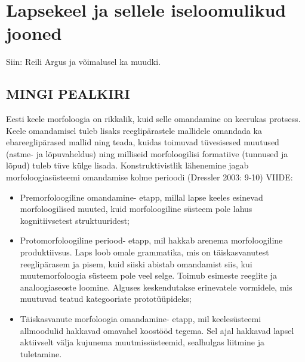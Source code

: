\documentclass[12pt]{article}
\begin{document}
\newpage
\section{Lapsekeel ja sellele iseloomulikud jooned}
Siin: Reili Argus ja võimalusel ka muudki.


\subsection{MINGI PEALKIRI}

Eesti keele morfoloogia on rikkalik, kuid selle omandamine on keerukas protsess. Keele omandamisel tuleb lisaks reeglipärastele mallidele omandada ka ebareeglipärased mallid ning teada, kuidas toimuvad tüvesisesed muutused (astme- ja lõpuvaheldus) ning milliseid morfoloogilisi formatiive (tunnused ja lõpud) tuleb tüve külge lisada. 
Konstruktivistlik lähenemine jagab morfoloogiasüsteemi omandamise kolme perioodi (Dressler 2003: 9-10) VIIDE:

\begin{itemize}
    \item Premorfoloogiline omandamine- etapp, millal lapse keeles esinevad morfoloogilised muuted, kuid morfoloogiline süsteem pole lahus kognitiivsetest struktuuridest;
    \item Protomorfoloogiline periood- etapp, mil hakkab arenema morfoloogiline produktiivsus. Laps loob omale grammatika, mis on täiskasvanutest reeglipärasem ja pisem, kuid siiski abistab omandamist siis, kui muutemorfoloogia süsteem pole veel selge. Toimub esimeste reeglite ja analoogiaseoste loomine. Alguses keskendutakse erinevatele vormidele, mis muutuvad teatud kategooriate prototüüpideks;
    \item Täiskasvanute morfoloogia omandamine- etapp, mil keelesüsteemi allmoodulid hakkavad omavahel koostööd tegema. Sel ajal hakkavad lapsel aktiivselt välja kujunema muutmissüsteemid, sealhulgas liitmine ja tuletamine.
\end{itemize}
\end{document}
